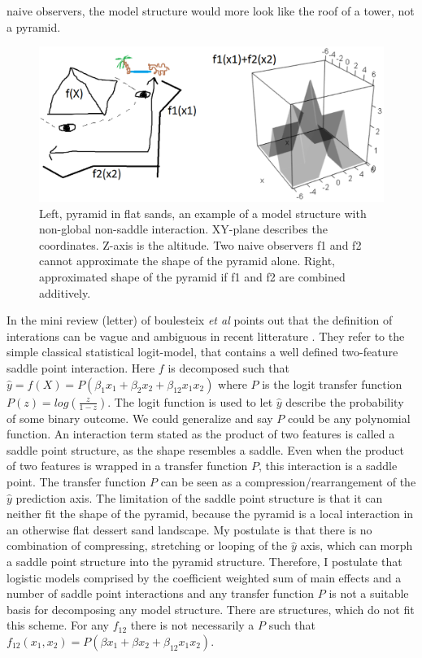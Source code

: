naive observers, the model structure would more look like the roof of a tower, not a pyramid. 

\begin{figure}
\includegraphics[width=\textwidth,height=\textheight,keepaspectratio]{graphics/sketch_pyramid_interaction.png}
\caption{Left, pyramid in flat sands, an example of a model structure with non-global non-saddle interaction. XY-plane describes the coordinates. Z-axis is the altitude. Two naive observers f1 and f2 cannot approximate the shape of the pyramid alone. Right, approximated shape of the pyramid if f1 and f2 are combined additively.}
\label{pyramid}
\end{figure}

In the mini review (letter) of boulesteix \textit{et al} points out that the definition of interations can be vague and ambiguous in recent litterature \cite{boulesteix2014letter}. They refer to the simple classical statistical logit-model, that contains a well defined two-feature saddle point interaction. Here $f$ is decomposed such that $\hat{y} = f(X) = P(\beta_1 x_1 + \beta_2 x_2 + \beta_{12} x_1 x_2)$ where $P$ is the logit transfer function $P(z) = log(\frac{z}{1-z})$. The logit function is used to let $\hat{y}$ describe the probability of some binary outcome. We could generalize and say $P$ could be any polynomial function. An interaction term stated as the product of two features is called a saddle point structure, as the shape resembles a saddle. Even when the product of two features is wrapped in a transfer function $P$, this interaction is a saddle point. The transfer function $P$ can be seen as a compression/rearrangement of the $\hat{y}$ prediction axis. The limitation of the saddle point structure is that it can neither fit the shape of the pyramid, because the pyramid is a local interaction in an otherwise flat dessert sand landscape. My postulate is that there is no combination of compressing, stretching or looping of the $\hat{y}$ axis, which can morph a saddle point structure into the pyramid structure. Therefore, I postulate that logistic models comprised by the coefficient weighted sum of main effects and a number of saddle point interactions and any transfer function $P$ is not a suitable basis for decomposing any model structure. There are structures, which do not fit this scheme. For any $f_{12}$ there is not necessarily a $P$ such that $f_{12}(x_1,x_2) = P(\beta x_1+ \beta x_2 + \beta_{12} x_1 x_2)$. 

